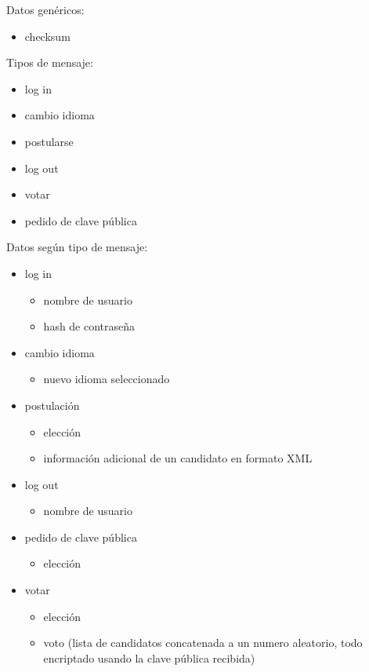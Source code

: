 Datos genéricos:
\begin{itemize}
 \item checksum
\end{itemize}

Tipos de mensaje:
\begin{itemize}
 \item log in 
 \item cambio idioma
 \item postularse
 \item log out
 \item votar
 \item pedido de clave pública
\end{itemize}

Datos según tipo de mensaje:
\begin{itemize}
 \item log in


  \begin{itemize}
    \item nombre de usuario
    \item hash de contraseña
  \end{itemize}
  \item cambio idioma
  

  \begin{itemize}
    \item nuevo idioma seleccionado
  \end{itemize}
  \item postulación
  
  \begin{itemize}
    \item elección
    \item información adicional de un candidato en formato XML
  \end{itemize}
  \item log out
  
  \begin{itemize}
    \item nombre de usuario
  \end{itemize}
  \item pedido de clave pública
  
  \begin{itemize}
    \item elección
  \end{itemize}
  \item votar
  
  \begin{itemize}
    \item elección
    \item voto (lista de candidatos concatenada a un 
			numero aleatorio, todo encriptado usando la clave pública recibida)
  \end{itemize}
\end{itemize}



